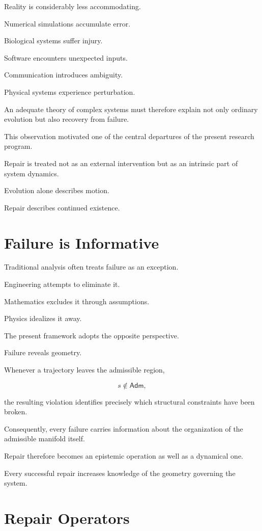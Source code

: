 \documentclass[11pt,oneside]{book}
\numberwithin{equation}{chapter}
\theoremstyle{definition}
\theoremstyle{plain}
\newcommand{\Adm}{\mathsf{Adm}}
\begin{document}
Reality is considerably less accommodating.

Numerical simulations accumulate error.

Biological systems suffer injury.

Software encounters unexpected inputs.

Communication introduces ambiguity.

Physical systems experience perturbation.

An adequate theory of complex systems must therefore explain not only
ordinary evolution but also recovery from failure.

This observation motivated one of the central departures of the present
research program.

Repair is treated not as an external intervention but as an intrinsic part
of system dynamics.

Evolution alone describes motion.

Repair describes continued existence.

\section{Failure is Informative}

Traditional analysis often treats failure as an exception.

Engineering attempts to eliminate it.

Mathematics excludes it through assumptions.

Physics idealizes it away.

The present framework adopts the opposite perspective.

Failure reveals geometry.

Whenever a trajectory leaves the admissible region,

\[
s \notin \Adm,
\]

the resulting violation identifies precisely which structural constraints
have been broken.

Consequently, every failure carries information about the organization of
the admissible manifold itself.

Repair therefore becomes an epistemic operation as well as a dynamical one.

Every successful repair increases knowledge of the geometry governing the
system.

\section{Repair Operators}
\end{document}
